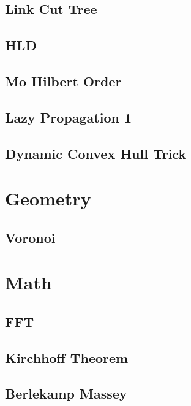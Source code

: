 \documentclass[10pt,landscape,a4paper,twocolumn]{article}
\begin{document}
\subsection{Link Cut Tree}


\subsection{HLD}


\subsection{Mo Hilbert Order}


\subsection{Lazy Propagation 1}


\subsection{Dynamic Convex Hull Trick}



\section{Geometry}

\subsection {Voronoi}


\section{Math}
\subsection{FFT}


\subsection{Kirchhoff Theorem}


\subsection{Berlekamp Massey}

\end{document}
